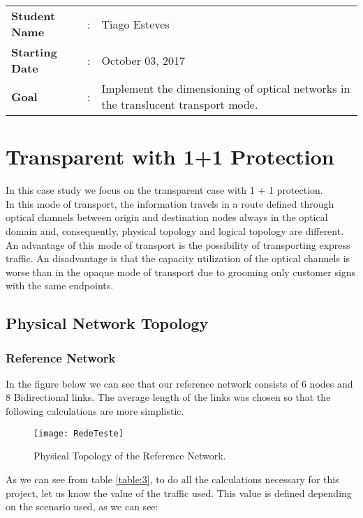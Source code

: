 \clearpage

\begin{tcolorbox}	
\begin{tabular}{p{2.75cm} p{0.2cm} p{10.5cm}} 	
\textbf{Student Name}  &:& Tiago Esteves\\
\textbf{Starting Date} &:& October 03, 2017\\
\textbf{Goal}          &:& Implement the dimensioning of optical networks in the translucent transport mode.
\end{tabular}
\end{tcolorbox}

\section{Transparent with 1+1 Protection}
In this case study we focus on the transparent case with 1 + 1 protection. \\
In this mode of transport, the information travels in a route defined through optical channels between origin and destination nodes always in the optical domain and, consequently, physical topology and logical topology are different.
An advantage of this mode of transport is the possibility of transporting express traffic.
An disadvantage is that the capacity utilization of the optical channels is worse than in the opaque mode of transport due to grooming only customer signs with the same endpoints.

\subsection{Physical Network Topology}

\subsubsection{Reference Network}
In the figure below we can see that our reference network consists of 6 nodes and 8 Bidirectional links.
The average length of the links was chosen so that the following calculations are more simplistic.

\begin{figure}[h!]
\centering
\texttt{[image: RedeTeste]}
\caption{Physical Topology of the Reference Network.}
\end{figure}

As we can see from table \ref{table:3}, to do all the calculations necessary for this project, let us know the value of the traffic used. This value is defined depending on the scenario used, as we can see:

